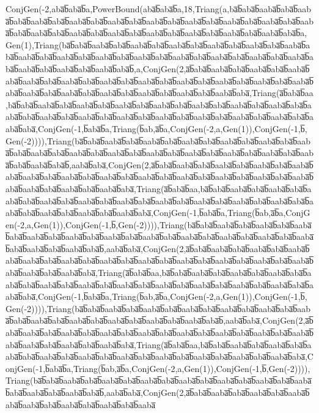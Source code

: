 ConjGen(-2,aba̅b̅aba̅b̅a,PowerBound(aba̅b̅aba̅b̅a,18,Triang(a,ba̅b̅aba̅b̅aaba̅b̅aba̅b̅aaba̅b̅aba̅b̅aaba̅b̅aba̅b̅aaba̅b̅aba̅b̅aaba̅b̅aba̅b̅aaba̅b̅aba̅b̅aaba̅b̅aba̅b̅aaba̅b̅aba̅b̅aaba̅b̅aba̅b̅aaba̅b̅aba̅b̅aaba̅b̅aba̅b̅aaba̅b̅aba̅b̅aaba̅b̅aba̅b̅aaba̅b̅aba̅b̅aaba̅b̅aba̅b̅aaba̅b̅aba̅b̅aaba̅b̅aba̅b̅a,Gen(1),Triang(ba̅b̅aba̅b̅aaba̅b̅aba̅b̅aaba̅b̅aba̅b̅aaba̅b̅aba̅b̅aaba̅b̅aba̅b̅aaba̅b̅aba̅b̅aaba̅b̅aba̅b̅aaba̅b̅aba̅b̅aaba̅b̅aba̅b̅aaba̅b̅aba̅b̅aaba̅b̅aba̅b̅aaba̅b̅aba̅b̅aaba̅b̅aba̅b̅aaba̅b̅aba̅b̅aaba̅b̅aba̅b̅aaba̅b̅aba̅b̅aaba̅b̅aba̅b̅aaba̅b̅aba̅b̅,a,ConjGen(2,a̅b̅aba̅b̅aaba̅b̅aba̅b̅aaba̅b̅aba̅b̅aaba̅b̅aba̅b̅aaba̅b̅aba̅b̅aaba̅b̅aba̅b̅aaba̅b̅aba̅b̅aaba̅b̅aba̅b̅aaba̅b̅aba̅b̅aaba̅b̅aba̅b̅aaba̅b̅aba̅b̅aaba̅b̅aba̅b̅aaba̅b̅aba̅b̅aaba̅b̅aba̅b̅aaba̅b̅aba̅b̅aaba̅b̅aba̅b̅aaba̅b̅aba̅b̅aaba̅b̅aba̅,Triang(a̅b̅aba̅b̅aa,ba̅b̅aba̅b̅aaba̅b̅aba̅b̅aaba̅b̅aba̅b̅aaba̅b̅aba̅b̅aaba̅b̅aba̅b̅aaba̅b̅aba̅b̅aaba̅b̅aba̅b̅aaba̅b̅aba̅b̅aaba̅b̅aba̅b̅aaba̅b̅aba̅b̅aaba̅b̅aba̅b̅aaba̅b̅aba̅b̅aaba̅b̅aba̅b̅aaba̅b̅aba̅b̅aaba̅b̅aba̅b̅aaba̅b̅aba̅b̅aaba̅b̅aba̅,ConjGen(-1,b̅aba̅b̅a,Triang(b̅ab,a̅b̅a,ConjGen(-2,a,Gen(1)),ConjGen(-1,b̅,Gen(-2)))),Triang(ba̅b̅aba̅b̅aaba̅b̅aba̅b̅aaba̅b̅aba̅b̅aaba̅b̅aba̅b̅aaba̅b̅aba̅b̅aaba̅b̅aba̅b̅aaba̅b̅aba̅b̅aaba̅b̅aba̅b̅aaba̅b̅aba̅b̅aaba̅b̅aba̅b̅aaba̅b̅aba̅b̅aaba̅b̅aba̅b̅aaba̅b̅aba̅b̅aaba̅b̅aba̅b̅aaba̅b̅aba̅b̅aaba̅b̅aba̅b̅,aaba̅b̅aba̅,ConjGen(2,a̅b̅aba̅b̅aaba̅b̅aba̅b̅aaba̅b̅aba̅b̅aaba̅b̅aba̅b̅aaba̅b̅aba̅b̅aaba̅b̅aba̅b̅aaba̅b̅aba̅b̅aaba̅b̅aba̅b̅aaba̅b̅aba̅b̅aaba̅b̅aba̅b̅aaba̅b̅aba̅b̅aaba̅b̅aba̅b̅aaba̅b̅aba̅b̅aaba̅b̅aba̅b̅aaba̅b̅aba̅b̅aaba̅b̅aba̅,Triang(a̅b̅aba̅b̅aa,ba̅b̅aba̅b̅aaba̅b̅aba̅b̅aaba̅b̅aba̅b̅aaba̅b̅aba̅b̅aaba̅b̅aba̅b̅aaba̅b̅aba̅b̅aaba̅b̅aba̅b̅aaba̅b̅aba̅b̅aaba̅b̅aba̅b̅aaba̅b̅aba̅b̅aaba̅b̅aba̅b̅aaba̅b̅aba̅b̅aaba̅b̅aba̅b̅aaba̅b̅aba̅b̅aaba̅b̅aba̅,ConjGen(-1,b̅aba̅b̅a,Triang(b̅ab,a̅b̅a,ConjGen(-2,a,Gen(1)),ConjGen(-1,b̅,Gen(-2)))),Triang(ba̅b̅aba̅b̅aaba̅b̅aba̅b̅aaba̅b̅aba̅b̅aaba̅b̅aba̅b̅aaba̅b̅aba̅b̅aaba̅b̅aba̅b̅aaba̅b̅aba̅b̅aaba̅b̅aba̅b̅aaba̅b̅aba̅b̅aaba̅b̅aba̅b̅aaba̅b̅aba̅b̅aaba̅b̅aba̅b̅aaba̅b̅aba̅b̅aaba̅b̅aba̅b̅,aaba̅b̅aba̅,ConjGen(2,a̅b̅aba̅b̅aaba̅b̅aba̅b̅aaba̅b̅aba̅b̅aaba̅b̅aba̅b̅aaba̅b̅aba̅b̅aaba̅b̅aba̅b̅aaba̅b̅aba̅b̅aaba̅b̅aba̅b̅aaba̅b̅aba̅b̅aaba̅b̅aba̅b̅aaba̅b̅aba̅b̅aaba̅b̅aba̅b̅aaba̅b̅aba̅b̅aaba̅b̅aba̅,Triang(a̅b̅aba̅b̅aa,ba̅b̅aba̅b̅aaba̅b̅aba̅b̅aaba̅b̅aba̅b̅aaba̅b̅aba̅b̅aaba̅b̅aba̅b̅aaba̅b̅aba̅b̅aaba̅b̅aba̅b̅aaba̅b̅aba̅b̅aaba̅b̅aba̅b̅aaba̅b̅aba̅b̅aaba̅b̅aba̅b̅aaba̅b̅aba̅b̅aaba̅b̅aba̅,ConjGen(-1,b̅aba̅b̅a,Triang(b̅ab,a̅b̅a,ConjGen(-2,a,Gen(1)),ConjGen(-1,b̅,Gen(-2)))),Triang(ba̅b̅aba̅b̅aaba̅b̅aba̅b̅aaba̅b̅aba̅b̅aaba̅b̅aba̅b̅aaba̅b̅aba̅b̅aaba̅b̅aba̅b̅aaba̅b̅aba̅b̅aaba̅b̅aba̅b̅aaba̅b̅aba̅b̅aaba̅b̅aba̅b̅aaba̅b̅aba̅b̅aaba̅b̅aba̅b̅,aaba̅b̅aba̅,ConjGen(2,a̅b̅aba̅b̅aaba̅b̅aba̅b̅aaba̅b̅aba̅b̅aaba̅b̅aba̅b̅aaba̅b̅aba̅b̅aaba̅b̅aba̅b̅aaba̅b̅aba̅b̅aaba̅b̅aba̅b̅aaba̅b̅aba̅b̅aaba̅b̅aba̅b̅aaba̅b̅aba̅b̅aaba̅b̅aba̅,Triang(a̅b̅aba̅b̅aa,ba̅b̅aba̅b̅aaba̅b̅aba̅b̅aaba̅b̅aba̅b̅aaba̅b̅aba̅b̅aaba̅b̅aba̅b̅aaba̅b̅aba̅b̅aaba̅b̅aba̅b̅aaba̅b̅aba̅b̅aaba̅b̅aba̅b̅aaba̅b̅aba̅b̅aaba̅b̅aba̅,ConjGen(-1,b̅aba̅b̅a,Triang(b̅ab,a̅b̅a,ConjGen(-2,a,Gen(1)),ConjGen(-1,b̅,Gen(-2)))),Triang(ba̅b̅aba̅b̅aaba̅b̅aba̅b̅aaba̅b̅aba̅b̅aaba̅b̅aba̅b̅aaba̅b̅aba̅b̅aaba̅b̅aba̅b̅aaba̅b̅aba̅b̅aaba̅b̅aba̅b̅aaba̅b̅aba̅b̅aaba̅b̅aba̅b̅,aaba̅b̅aba̅,ConjGen(2,a̅b̅aba̅b̅aaba̅b̅aba̅b̅aaba̅b̅aba̅b̅aaba̅b̅aba̅b̅aaba̅b̅aba̅b̅aaba̅b̅aba̅b̅aaba̅b̅aba̅b̅aaba̅